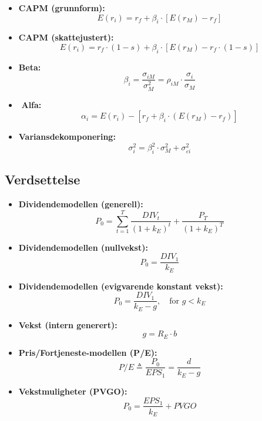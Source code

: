 \documentclass[
  11pt,
  a4paper,
]{article}
\begin{document}
\begin{itemize}
\item
  \textbf{CAPM (grunnform):}\\
  \[
  E(r_i) = r_f + \beta_i \cdot \left[ E(r_M) - r_f \right]
  \]
\item
  \textbf{CAPM (skattejustert):}\\
  \[
  E(r_i) = r_f \cdot (1-s) + \beta_i \cdot \left[ E(r_M) - r_f \cdot (1 - s) \right]
  \]
\item
  \textbf{Beta:}\\
  \[
  \beta_i = \frac{\sigma_{iM}}{\sigma_M^2} = \rho_{iM} \cdot \frac{\sigma_i}{\sigma_M}
  \]
\item
  ️ \textbf{Alfa:}\\
  \[
  \alpha_i = E(r_i) - \left[ r_f + \beta_i \cdot \left( E(r_M) - r_f \right) \right]
  \]
\item
  \textbf{Variansdekomponering:}\\
  \[
  \sigma_i^2 = \beta_i^2 \cdot \sigma_M^2 + \sigma_{\varepsilon i}^2
  \]
\end{itemize}

\subsection{Verdsettelse}\label{verdsettelse}

\begin{itemize}
\item
  \textbf{Dividendemodellen (generell):}\\
  \[
  P_0 = \sum_{t = 1}^{T} \frac{DIV_t}{(1 + k_E)^t} + \frac{P_T}{(1+k_E)^T}
  \]
\item
  \textbf{Dividendemodellen (nullvekst):}\\
  \[
  P_0 = \frac{DIV_1}{k_E}
  \]
\item
  \textbf{Dividendemodellen (evigvarende konstant vekst):}\\
  \[
  P_0 = \frac{DIV_1}{k_E - g}, \quad \text{for } g < k_E
  \]
\item
  \textbf{Vekst (intern generert):}\\
  \[
  g = R_E \cdot b
  \]
\item
  \textbf{Pris/Fortjeneste-modellen (P/E):}\\
  \[
  P/E \triangleq \frac{P_0}{EPS_1} = \frac{d}{k_E - g}
  \]
\item
  \textbf{Vekstmuligheter (PVGO):}\\
  \[
  P_0 = \frac{EPS_1}{k_E} + PVGO
  \]
\end{itemize}
\end{document}

